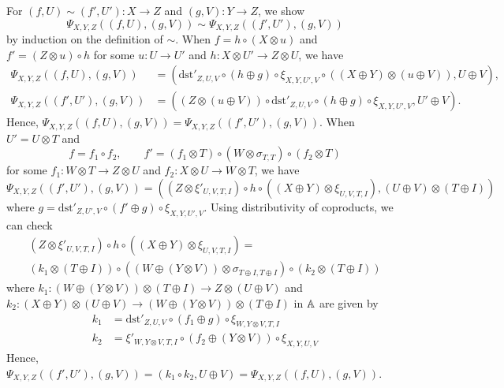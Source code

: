 For $(f,U) \sim (f',U') \colon X \to Z$ and $(g,V) \colon Y \to Z$,
we show
\begin{equation*}
  \Psi_{X,Y,Z}((f,U),(g,V)) \sim \Psi_{X,Y,Z}((f',U'),(g,V))
\end{equation*}
by induction on the definition of $\sim$. 
When $f = h \circ (X \otimes u)$ and $f' = (Z \otimes u) \circ h$
for some $u \colon U \to U'$ and $h \colon X \otimes U' \to Z \otimes U$,
we have
\begin{align*}
  \Psi_{X,Y,Z}((f,U),(g,V)) &= (\mathrm{dst}'_{Z,U,V} \circ
  (h \oplus g) \circ \xi_{X,Y,U',V} \circ ((X \oplus Y) \otimes (u \oplus V)),U \oplus V), \\
  \Psi_{X,Y,Z}((f',U'),(g,V)) &= ((Z \otimes (u \oplus V)) \circ \mathrm{dst}'_{Z,U,V} \circ
  (h \oplus g) \circ \xi_{X,Y,U',V},U' \oplus V).
\end{align*}
Hence, $\Psi_{X,Y,Z}((f,U),(g,V)) = \Psi_{X,Y,Z}((f',U'),(g,V))$.
When $U' = U \otimes T$ and 
\begin{equation*}
  f = f_{1} \circ f_{2}, \qquad
  f' = (f_{1} \otimes T) \circ (W \otimes \sigma_{T,T}) \circ (f_{2} \otimes T)
\end{equation*}
for some $f_{1} \colon W \otimes T \to Z \otimes U$
and $f_{2} \colon X \otimes U \to W \otimes T$, we have
\begin{equation*}
  \Psi_{X,Y,Z}((f',U'),(g,V))
  = ((Z \otimes \xi'_{U,V,T,I}) \circ h \circ ((X \oplus Y) \otimes \xi_{U,V,T,I}),
  (U \oplus V) \otimes (T \oplus I))
\end{equation*}
where $g = \mathrm{dst}'_{Z,U',V} \circ (f' \oplus g) \circ \xi_{X,Y,U',V}$.
Using distributivity of coproducts, we can check
\begin{multline*}
  (Z \otimes \xi'_{U,V,T,I}) \circ h \circ ((X \oplus Y) \otimes \xi_{U,V,T,I}) = \\
  (k_{1} \otimes (T \oplus I)) \circ
  ((W \oplus (Y \otimes V)) \otimes \sigma_{T \oplus I,T \oplus I}) \circ
  (k_{2} \otimes (T \oplus I))
\end{multline*}
where $k_{1} \colon (W \oplus (Y \otimes V)) \otimes (T \oplus I) \to Z \otimes (U \oplus V)$
and $k_{2} \colon (X \oplus Y) \otimes (U \oplus V) \to (W \oplus (Y \otimes V))
\otimes (T \oplus I)$ in $\mathbb{A}$ are given by
\begin{align*}
  k_{1} &= \mathrm{dst}'_{Z,U,V} \circ (f_{1} \oplus g) \circ \xi_{W,Y \otimes V,T,I} \\
  k_{2} &= \xi'_{W,Y \otimes V,T,I} \circ (f_{2} \oplus (Y \otimes V)) \circ \xi_{X,Y,U,V} 
\end{align*} 
Hence, $\Psi_{X,Y,Z}((f',U'),(g,V)) = (k_{1} \circ k_{2},U \oplus V) =
\Psi_{X,Y,Z}((f,U),(g,V))$.

